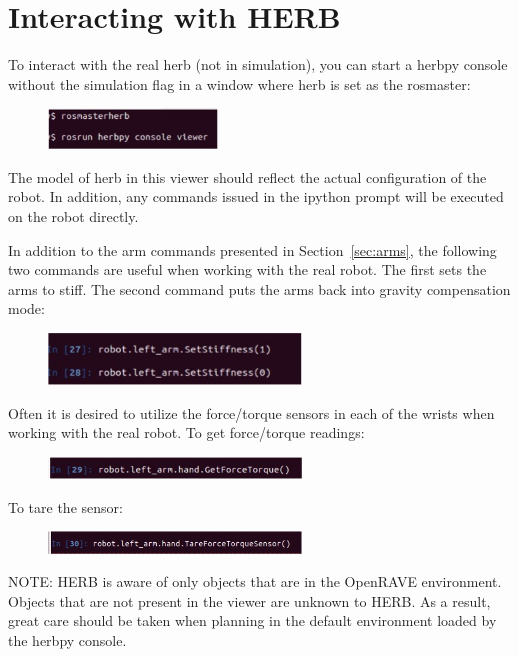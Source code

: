 \documentclass[11pt, oneside]{article}
\begin{document}
\newpage
\section{Interacting with HERB}
To interact with the real herb (not in simulation), you can start a herbpy console without the simulation flag in a window where herb is set as the rosmaster:
\begin{figure}[h]
\centering
\includegraphics[width=0.4\textwidth]{figs/realherb}
\end{figure}

The model of herb in this viewer should reflect the actual configuration of the robot.  In addition, any commands issued in the ipython prompt  will be executed on the robot directly.

In addition to the arm commands presented in Section~\ref{sec:arms}, the following two commands are useful when working with the real robot. The first sets the arms to stiff.  The second command puts the arms back into gravity compensation mode:
\begin{figure}[h]
\centering
\includegraphics[width=0.6\textwidth]{figs/setstiffness}
\end{figure}

\newpage
Often it is desired to utilize the force/torque sensors in each of the wrists when working with the real robot.  To get force/torque readings:
\begin{figure}[h]
\centering
\includegraphics[width=0.6\textwidth]{figs/forcetorque}
\end{figure}

To tare the sensor:
\begin{figure}[h]
\centering
\includegraphics[width=0.6\textwidth]{figs/forcetorquetare}
\end{figure}


NOTE:  HERB is aware of only objects that are in the OpenRAVE environment.  Objects that are not present in the viewer are unknown to HERB. As a result, great care should be taken when planning in the default environment loaded by the herbpy console.
\end{document}
